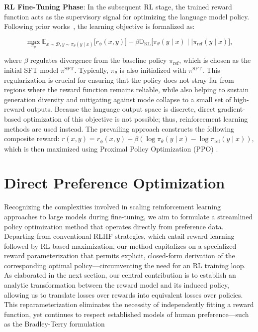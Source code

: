\textbf{RL Fine-Tuning Phase}: In the subsequent RL stage, the trained reward function acts as the supervisory signal for optimizing the language model policy. Following prior works~\citep{jaques2017sequence, jaques2020human}, the learning objective is formalized as:

\begin{equation}\label{eq:RL}
\max_{\pi_{\theta}}  \mathbb{E}_{x\sim \mathcal{D}, y\sim \pi_{\theta}(y \mid x)}\bigl[r_{\phi}(x, y)\bigr] - \beta\mathbb{D}_{\textrm{KL}}\bigl[\pi_{\theta}(y\mid x)\mid \mid \pi_\text{ref}(y\mid x)\bigr],
\end{equation}

where $\beta$ regulates divergence from the baseline policy $\pi_\text{ref}$, which is chosen as the initial SFT model $\pi^\text{SFT}$. Typically, $\pi_\theta$ is also initialized with $\pi^\text{SFT}$. This regularization is crucial for ensuring that the policy does not stray far from regions where the reward function remains reliable, while also helping to sustain generation diversity and mitigating against mode collapse to a small set of high-reward outputs. Because the language output space is discrete, direct gradient-based optimization of this objective is not possible; thus, reinforcement learning methods are used instead. The prevailing approach \citep{ziegler2020finetuning, stiennon2022learning, bai2022training, ouyang2022training} constructs the following composite reward: ${r(x, y) = r_{\phi}(x, y) -\beta (\log \pi_{\theta}(y\mid x) - \log \pi_\text{ref}(y\mid x))}$, which is then maximized using Proximal Policy Optimization (PPO) \cite{schulman2017proximal}.

\section{Direct Preference Optimization}\label{sec:DPO}

Recognizing the complexities involved in scaling reinforcement learning approaches to large models during fine-tuning, we aim to formulate a streamlined policy optimization method that operates directly from preference data. Departing from conventional RLHF strategies, which entail reward learning followed by RL-based maximization, our method capitalizes on a specialized reward parameterization that permits explicit, closed-form derivation of the corresponding optimal policy—circumventing the need for an RL training loop. As elaborated in the next section, our central contribution is to establish an analytic transformation between the reward model and its induced policy, allowing us to translate losses over rewards into equivalent losses over policies. This reparameterization eliminates the necessity of independently fitting a reward function, yet continues to respect established models of human preference—such as the Bradley-Terry formulation

